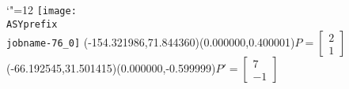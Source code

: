 \setlength{\unitlength}{1pt}%
\makeatletter%
\let\ASYencoding\f@encoding%
\let\ASYfamily\f@family%
\let\ASYseries\f@series%
\let\ASYshape\f@shape%
\makeatother%
{\catcode`"=12%
\texttt{[image: \\ASYprefix\\jobname-76\_0]}%
}%
\color{ASYcolor}%
\fontsize{12.000000}{14.400000}\selectfont%
\usefont{\ASYencoding}{\ASYfamily}{\ASYseries}{\ASYshape}%
\ASYalign(-154.321986,71.844360)(0.000000,0.400001){$P=\left[ \begin{array}{c} 2 \\ 1 \end{array}\right]$}%
\color{ASYcolor}%
\fontsize{12.000000}{14.400000}\selectfont%
\ASYalign(-66.192545,31.501415)(0.000000,-0.599999){$P'=\left[ \begin{array}{c} 7 \\ -1 \end{array} \right]$}%
